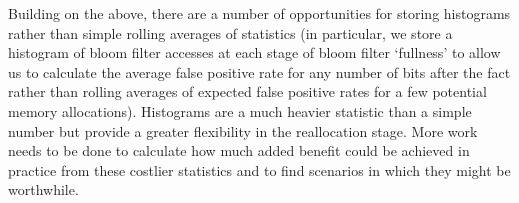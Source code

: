 \documentclass{sig-alternate-05-2015}
\begin{document}
Building on the above, there are a number of opportunities for storing histograms rather than simple rolling averages of statistics (in particular, we store a histogram of bloom filter accesses at each stage of bloom filter `fullness' to allow us to calculate the average false positive rate for any number of bits after the fact rather than rolling averages of expected false positive rates for a few potential memory allocations). Histograms are a much heavier statistic than a simple number but provide a greater flexibility in the reallocation stage. More work needs to be done to calculate how much added benefit could be achieved in practice from these costlier statistics and to find scenarios in which they might be worthwhile.


\small

\end{document}
